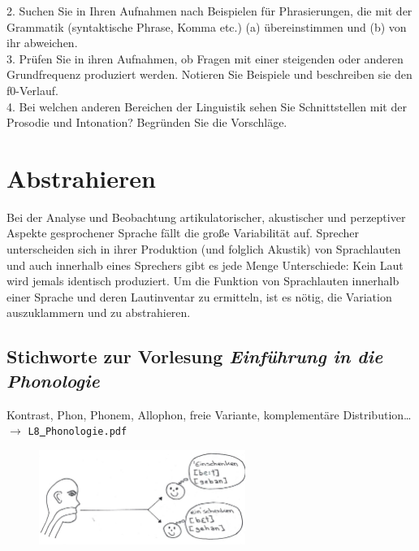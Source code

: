 \documentclass[11pt]{book}
\begin{document}
2.	Suchen Sie in Ihren Aufnahmen nach Beispielen für Phrasierungen, die mit der Grammatik (syntaktische Phrase, Komma etc.) (a)  übereinstimmen und (b) von ihr abweichen.
\vspace*{3cm}\\
3.	Prüfen Sie in ihren Aufnahmen, ob Fragen mit einer steigenden oder anderen Grundfrequenz produziert werden.  Notieren Sie Beispiele und beschreiben sie den f0-Verlauf.
\vspace*{3cm}\\

4.	Bei welchen anderen Bereichen der Linguistik sehen Sie Schnittstellen mit der Prosodie und Intonation? Begründen Sie die Vorschläge.\vspace*{1cm}\\








\chapter{Abstrahieren} 

Bei der Analyse und Beobachtung artikulatorischer, akustischer und perzeptiver Aspekte gesprochener Sprache fällt die große Variabilität auf. Sprecher unterscheiden sich in ihrer Produktion (und folglich Akustik) von Sprachlauten und auch innerhalb eines Sprechers gibt es jede Menge Unterschiede: Kein Laut  wird jemals identisch produziert. Um die Funktion von Sprachlauten innerhalb einer Sprache und deren Lautinventar zu ermitteln, ist es nötig, die Variation auszuklammern und zu abstrahieren.

\section{Stichworte zur Vorlesung \em{Einführung in die Phonologie}}

Kontrast, Phon, Phonem, Allophon, freie Variante, komplementäre Distribution\dots $\rightarrow$ {\tt L8\underline{\ }Phonologie.pdf}

\begin{figure}[htbp]
\begin{center}
\includegraphics[width=0.6\textwidth]{grafiken/abstrahieren/distinktive-merkmale}
\label{t6}
\end{center}
\end{figure}
\end{document}
